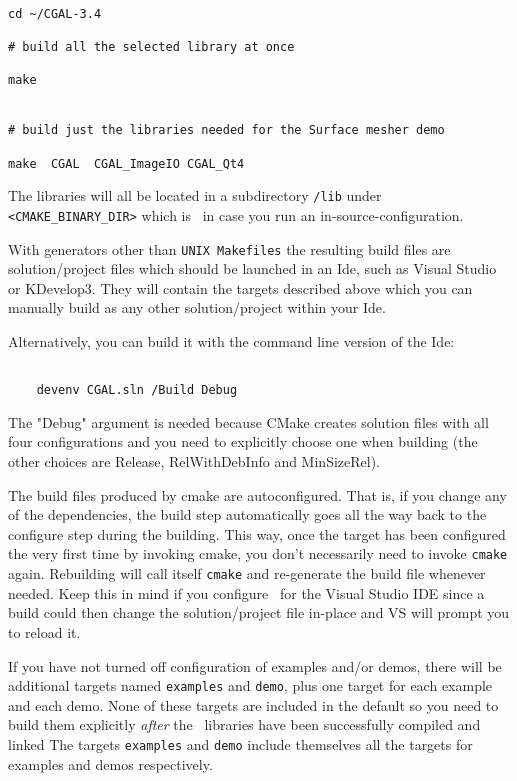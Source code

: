 {\ccTexHtml{\scriptsize}{}
\begin{verbatim}

cd ~/CGAL-3.4

# build all the selected library at once

make 


# build just the libraries needed for the Surface mesher demo

make  CGAL  CGAL_ImageIO CGAL_Qt4

\end{verbatim}
}

The libraries will all be located in a subdirectory {\tt /lib} under {\tt <CMAKE\_BINARY\_DIR>}
which is \cgaldir\ in case you run an in-source-configuration.

With generators other than {\tt UNIX Makefiles} the resulting build files are solution/project files which
should be launched in an {\sc Ide}, such as Visual Studio or KDevelop3. They will contain the targets described
above which you can manually build as any other solution/project within your {\sc Ide}.

Alternatively, you can build it with the command line version of the {\sc Ide}:

{\ccTexHtml{\scriptsize}{}
\begin{verbatim}

    devenv CGAL.sln /Build Debug

\end{verbatim}
}

The "Debug" argument is needed because CMake creates solution files with
all four configurations and you need to explicitly choose one when building
(the other choices are Release, RelWithDebInfo and MinSizeRel).


\begin{ccAdvanced}
The build files produced by cmake are autoconfigured. That is, if you change any 
of the dependencies, the build step automatically goes all the way back to the configure step
during the building. This way, once the target has been configured the very first time by
invoking cmake, you don't necessarily need to invoke \texttt{cmake} again. Rebuilding will call
itself \texttt{cmake} and re-generate the build file whenever needed. Keep this in mind if you
configure \cgal\ for the Visual Studio IDE since a build could then change the solution/project 
file in-place and VS will prompt you to reload it.
\end{ccAdvanced}


If you have not turned off configuration of examples and/or demos, there will be additional
targets named \texttt{examples} and \texttt{demo}, plus one target for each example and each demo.
None of these targets are included in the default so you need to build them explicitly
{\em after} the \cgal\ libraries have been successfully compiled and linked
The targets \texttt{examples} and \texttt{demo} include themselves all the targets
for examples and demos respectively.


